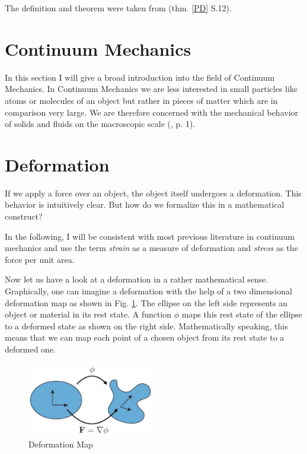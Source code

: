 The definition and theorem were taken from \cite{Spencer1980} (thm. \ref{PD} S.12).





\section{Continuum Mechanics}
In this section I will give a broad introduction into the field of Continuum Mechanics. In Continuum Mechanics we are less interested in small particles like atoms or molecules of an object but rather in pieces of matter which are in comparison very large. We are therefore concerned with the mechanical behavior of solids and fluids on the macroscopic scale (\cite{Spencer1980}, p. 1).


\section{Deformation}
If we apply a force over an object, the object itself undergoes a deformation. This behavior is intuitively clear. But how do we formalize this in a mathematical construct? 

In the following, I will be consistent with most previous literature in continuum mechanics and use the term \textit{strain} as a measure of deformation and \textit{stress} as the force per unit area.


Now let us have a look at a deformation in a rather mathematical sense. Graphically, one can imagine a deformation with the help of a two dimensional deformation map as shown in Fig. \ref{fig:deformationmap}. The ellipse on the left side represents an object or material in its rest state. A function $\phi$ maps this rest state of the ellipse to a deformed state as shown on the right side. Mathematically speaking, this means that we can map each point of a chosen object from its rest state to a deformed one.

\begin{figure}[!htbp]
	\centering
	\includegraphics[width=0.5\textwidth]{resources/deformation_map}
	\caption{Deformation Map {\cite{STREAM2018}}}
	\label{fig:deformationmap}
\end{figure}

